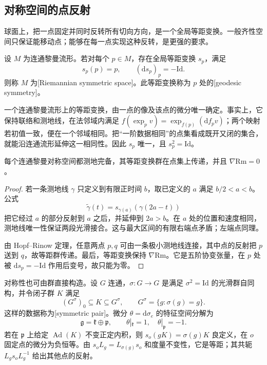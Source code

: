 \subsection{对称空间的点反射}
\label{g3:subsec:0504:02}

球面上，把一点固定并同时反转所有切向方向，是一个全局等距变换。一般齐性空间只保证能移动点；能够在每一点实现这种反转，是更强的要求。

\begin{definition}\label{g3:def:riemannian-symmetric-space}
	设 \(M\) 为连通黎曼流形。若对每个 \(p\in M\)，存在全局等距变换 \(s_p\)，满足
	\[
		s_p(p)=p,\qquad (\mathrm ds_p)_p=-\mathrm{Id}.
	\]
	则称 \(M\) 为[Riemannian symmetric space]。此等距变换称为 \(p\) 处的[geodesic symmetry]。
\end{definition}

一个连通黎曼流形上的等距变换，由一点的像及该点的微分唯一确定。事实上，它保持联络和测地线，在法邻域内满足 \(f(\exp_pv)=\exp_{f(p)}(\mathrm df_pv)\)；两个映射若初值一致，便在一个邻域相同。把“一阶数据相同”的点集看成既开又闭的集合，就能沿连通流形延伸这一相同性。因此 \(s_p\) 唯一，且 \(s_p^2=\mathrm{Id}\)。

\begin{proposition}\label{g3:prop:symmetric-complete-parallel-curvature}
	每个连通黎曼对称空间都测地完备，其等距变换群在点集上传递，并且 \(\nabla\mathrm{Rm}=0\)。
\end{proposition}
\begin{proof}
	若一条测地线 \(\gamma\) 只定义到有限正时间 \(b\)，取已定义的 \(a\) 满足 \(b/2<a<b\)。公式
	\[
		\widetilde\gamma(t)=s_{\gamma(a)}(\gamma(2a-t))
	\]
	把它经过 \(a\) 的部分反射到 \(a\) 之后，并延伸到 \(2a>b\)。在 \(a\) 处的位置和速度相同，测地线唯一性保证两段光滑接合。这与最大区间的有限右端点矛盾；左端点同理。

	由 Hopf--Rinow 定理，任意两点 \(p,q\) 可由一条极小测地线连接，其中点的反射把 \(p\) 送到 \(q\)，故等距群传递。最后，等距变换保持 \(\nabla\mathrm{Rm}\)。它是五阶协变张量，在 \(p\) 处被 \(\mathrm ds_p=-\mathrm{Id}\) 作用后变号，故只能为零。
\end{proof}

对称性也可由群直接构造。设 \(G\) 连通，\(\sigma:G\to G\) 是满足 \(\sigma^2=\mathrm{Id}\) 的光滑群自同构，并令闭子群 \(K\) 满足
\[
	(G^\sigma)_0\subseteq K\subseteq G^\sigma,
	\qquad G^\sigma=\{g:\sigma(g)=g\}.
\]
这样的数据称为[symmetric pair]。微分 \(\theta=\mathrm d\sigma_e\) 的特征空间分解为
\begin{equation}\label{g3:eq:symmetric-lie-algebra-splitting}
	\mathfrak g=\mathfrak k\oplus\mathfrak p,
	\qquad \theta|_{\mathfrak k}=1,\quad \theta|_{\mathfrak p}=-1.
\end{equation}
若在 \(\mathfrak p\) 上给定 \(\operatorname{Ad}(K)\) 不变正定内积，则 \(s_o(gK)=\sigma(g)K\) 良定义，在 \(o\) 固定点的微分为负恒等。由 \(s_oL_g=L_{\sigma(g)}s_o\) 和度量不变性，它是等距；其共轭 \(L_gs_oL_g^{-1}\) 给出其他点的反射。

